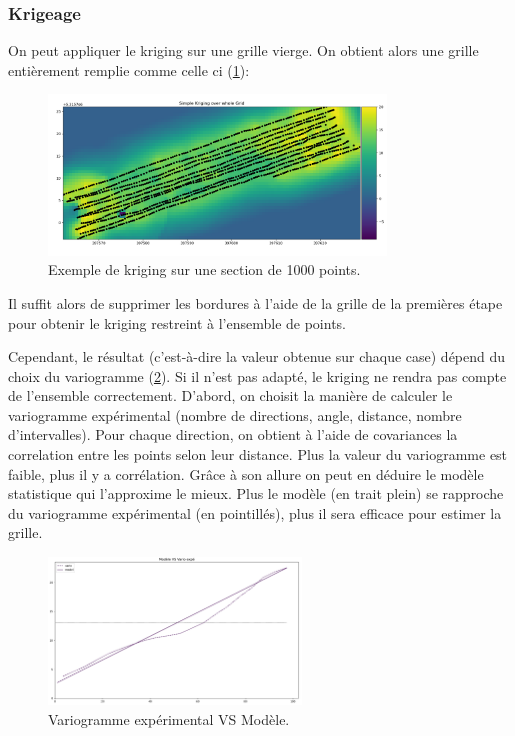 \documentclass[12pt]{article}
\begin{document}
\subsubsection{Krigeage}

    On peut appliquer le kriging sur une grille vierge. On obtient alors une grille entièrement remplie comme celle ci (\ref{fig:2_grid_krex_im}):

    \begin{figure}[ht!]
        \centering
        \includegraphics[width=0.8\textwidth]{Images/Grid_Kriging_ex.png}
        \caption{Exemple de kriging sur une section de 1000 points.}
        \label{fig:2_grid_krex_im}
    \end{figure}

    Il suffit alors de supprimer les bordures à l'aide de la grille de la premières étape pour obtenir le kriging restreint à l'ensemble de points.
    
    Cependant, le résultat (c'est-à-dire la valeur obtenue sur chaque case) dépend du choix du variogramme (\ref{fig:2_grid_kriging_variog}). Si il n'est pas adapté, le kriging ne rendra pas compte de l'ensemble correctement. D'abord, on choisit la manière de calculer le variogramme expérimental (nombre de directions, angle, distance, nombre d'intervalles). Pour chaque direction, on obtient à l'aide de covariances la correlation entre les points selon leur distance. Plus la valeur du variogramme est faible, plus il y a corrélation. Grâce à son allure on peut en déduire le modèle statistique qui l'approxime le mieux. Plus le modèle (en trait plein) se rapproche du variogramme expérimental (en pointillés), plus il sera efficace pour estimer la grille.

     \begin{figure}[ht!]
        \centering
        \includegraphics[width=0.6\textwidth]{Images/Grid_Kriging_Variog.png}  
        \caption{Variogramme expérimental VS Modèle.}
        \label{fig:2_grid_kriging_variog}
    \end{figure}
\end{document}
